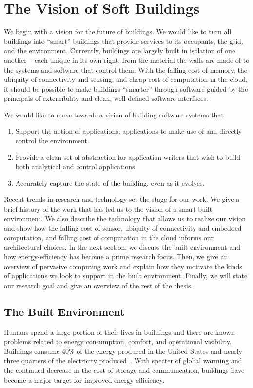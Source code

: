 \chapter{The Vision of Soft Buildings}

We begin with a vision for the future of buildings.  We would like to turn all buildings into ``smart''
buildings that provide services to its occupants, the grid, and the environment.  Currently, buildings
are largely built in isolation of one another -- each unique in its own right, from the material the walls
are made of to the systems and software that control them.  With the falling cost of memory, the ubiquity of
connectivity and sensing, and cheap cost of computation in the cloud, it should be possible to make buildings ``smarter''
through software guided by the principals of extensibility and clean, well-defined software interfaces.

We would like to move towards a vision of building software systems that

\begin{enumerate}
\item Support the notion of applications; applications to make use of and directly control the environment.
\item Provide a clean set of abstraction for application writers that wish to build both analytical and control
applications.
\item Accurately capture the state of the building, even as it evolves.
\end{enumerate}


Recent trends in research and technology set the stage for our work.  We give a brief history of the work that has 
led us to the vision of a smart built environment.  We also describe the technology that
allows us to realize our vision and show how the falling cost of sensor, ubiquity of connectivity and embedded computation,
and falling cost of computation in the cloud informs our architectural choices.
In the next section, 
we discuss the built environment and how energy-efficiency has become a prime research focus.
Then, we give an overview of pervasive computing work and explain how they motivate the kinds of applications we look 
to support in the built environment.  Finally, we will state our research goal and give an overview of the rest
of the thesis.




\section{The Built Environment}
Humans spend a large portion of their lives in buildings and
there are known problems related to energy consumption, comfort, and operational visibility.  
Buildings consume 40\% of the energy produced in the United States and nearly three quarters of 
the electricity produced~\cite{epabuildings}.  With specter of global warming and the continued decrease in the cost of storage and 
communication, buildings have become a major target for improved energy efficiency.

